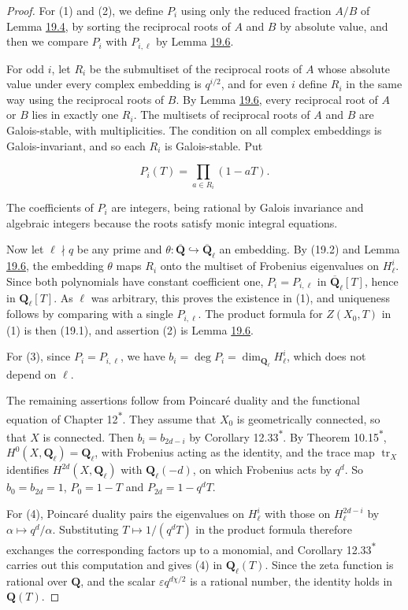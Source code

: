 \documentclass[11pt]{article}
\newcommand{\bpout}[1]{#1\textsuperscript{\hyperlink{bp-outside}{\ensuremath{\ast}}}}
\begin{document}
\begin{proof}[{Proof}]\label{bp343}%
For (1) and (2), we define \(P_i\) using only the reduced fraction \(A/B\) of Lemma \hyperref[bp333]{19.4}, by sorting the reciprocal roots of \(A\) and \(B\) by absolute value, and then we compare \(P_i\) with \(P_{i,\ell}\) by Lemma \hyperref[bp340]{19.6}.

For odd \(i\), let \(R_i\) be the submultiset of the reciprocal roots of \(A\) whose absolute value under every complex embedding is \(q^{i/2}\), and for even \(i\) define \(R_i\) in the same way using the reciprocal roots of \(B\). By Lemma \hyperref[bp340]{19.6}, every reciprocal root of \(A\) or \(B\) lies in exactly one \(R_i\). The multisets of reciprocal roots of \(A\) and \(B\) are Galois-stable, with multiplicities. The condition on all complex embeddings is Galois-invariant, and so each \(R_i\) is Galois-stable. Put

\[
P_i(T)=\prod_{a\in R_i}(1-aT).
\]

The coefficients of \(P_i\) are integers, being rational by Galois invariance and algebraic integers because the roots satisfy monic integral equations.

Now let \(\ell\nmid q\) be any prime and \(\theta:\overline{\mathbf Q}\hookrightarrow\overline{\mathbf Q}_\ell\) an embedding. By (19.2) and Lemma \hyperref[bp340]{19.6}, the embedding \(\theta\) maps \(R_i\) onto the multiset of Frobenius eigenvalues on \(H^i_\ell\). Since both polynomials have constant coefficient one, \(P_i=P_{i,\ell}\) in \(\overline{\mathbf Q}_\ell[T]\), hence in \(\mathbf Q_\ell[T]\). As \(\ell\) was arbitrary, this proves the existence in (1), and uniqueness follows by comparing with a single \(P_{i,\ell}\). The product formula for \(Z(X_0,T)\) in (1) is then (19.1), and assertion (2) is Lemma \hyperref[bp340]{19.6}.

For (3), since \(P_i=P_{i,\ell}\), we have \(b_i=\deg P_i=\dim_{\mathbf Q_\ell}H^i_\ell\), which does not depend on \(\ell\).

The remaining assertions follow from Poincaré duality and the functional equation of Chapter \bpout{12}. They assume that \(X_0\) is geometrically connected, so that \(X\) is connected. Then \(b_i=b_{2d-i}\) by Corollary \bpout{12.33}. By Theorem \bpout{10.15}, \(H^0(X,\mathbf Q_\ell)=\mathbf Q_\ell\), with Frobenius acting as the identity, and the trace map \(\operatorname{tr}_X\) identifies \(H^{2d}(X,\mathbf Q_\ell)\) with \(\mathbf Q_\ell(-d)\), on which Frobenius acts by \(q^d\). So \(b_0=b_{2d}=1\), \(P_0=1-T\) and \(P_{2d}=1-q^dT\).

For (4), Poincaré duality pairs the eigenvalues on \(H^i_\ell\) with those on \(H^{2d-i}_\ell\) by \(\alpha\mapsto q^d/\alpha\). Substituting \(T\mapsto1/(q^dT)\) in the product formula therefore exchanges the corresponding factors up to a monomial, and Corollary \bpout{12.33} carries out this computation and gives (4) in \(\mathbf Q_\ell(T)\). Since the zeta function is rational over \(\mathbf Q\), and the scalar \(\varepsilon q^{d\chi/2}\) is a rational number, the identity holds in \(\mathbf Q(T)\).
\end{proof}
\end{document}
